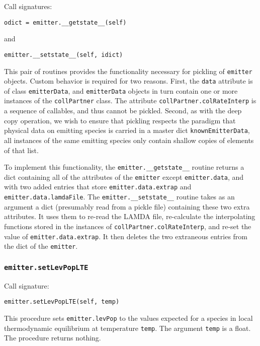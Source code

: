 \documentclass[12pt]{article}
\begin{document}
Call signatures:

\begin{verbatim}
odict = emitter.__getstate__(self)
\end{verbatim}
and
\begin{verbatim}
emitter.__setstate__(self, idict)
\end{verbatim}

This pair of routines provides the functionality necessary for pickling of \verb=emitter= objects. Custom behavior is required for two reasons. First, the \verb=data= attribute is of class \verb=emitterData=, and \verb=emitterData= objects in turn contain one or more instances of the \verb=collPartner= class. The attribute \verb=collPartner.colRateInterp= is a sequence of callables, and thus cannot be pickled. Second, as with the deep copy operation, we wish to ensure that pickling respects the paradigm that physical data on emitting species is carried in a master dict \verb=knownEmitterData=, all instances of the same emitting species only contain shallow copies of elements of that list.

To implement this functionality, the \verb=emitter.__getstate__= routine returns a dict containing all of the attributes of the \verb=emitter= except \verb=emitter.data=, and with two added entries that store \verb=emitter.data.extrap= and \verb=emitter.data.lamdaFile=. The \verb=emitter.__setstate__= routine takes as an argument a dict (presumably read from a pickle file) containing these two extra attributes. It uses them to re-read the LAMDA file, re-calculate the interpolating functions stored in the instances of \verb=collPartner.colRateInterp=, and re-set the value of \verb=emitter.data.extrap=. It then deletes the two extraneous entries from the dict of the \verb=emitter=.

\subsubsection{\texttt{emitter.setLevPopLTE}}

Call signature:

\begin{verbatim}
emitter.setLevPopLTE(self, temp)
\end{verbatim}

This procedure sets \verb=emitter.levPop= to the values expected for a species in local thermodynamic equilibrium at temperature \verb=temp=. The argument \verb=temp= is a float. The procedure returns nothing.
\end{document}
